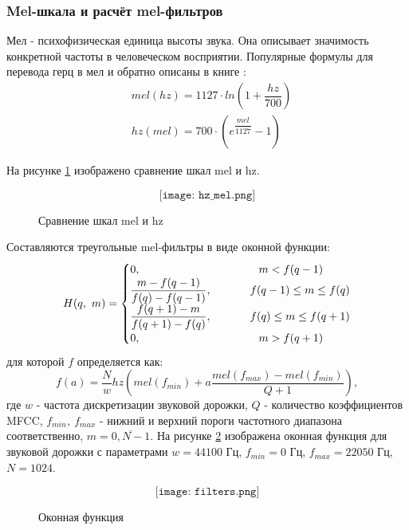 \subsubsection{Mel-шкала и расчёт mel-фильтров}
Мел - психофизическая единица высоты звука. Она описывает значимость конкретной частоты в человеческом восприятии. 
Популярные формулы для перевода герц в мел и обратно описаны в книге \cite{Mel}:
\begin{align}
	&mel(hz) = 1127 \cdot ln(1 + \dfrac{hz}{700})\\
	&hz(mel) = 700 \cdot (e^{\dfrac{mel}{1127}}-1)
\end{align}

На рисунке \ref{fig:hz_mel} изображено сравнение шкал mel и hz.

\begin{figure}[H]
	\[\texttt{[image: hz\_mel.png]}\]
	\caption{Сравнение шкал mel и hz}
	\label{fig:hz_mel}
\end{figure}


Составляются треугольные mel-фильтры в виде оконной функции:
\begin{equation}
	H(q,~m)=
	\begin{cases}
		0, 										     & \Phantom \phantom{-}    m < f(q-1)\\
		\dfrac{m-f(q-1)}{f(q)-f(q-1)},   & \Phantom f(q-1) \leq m \leq f(q)\\
		\dfrac{f(q+1)-m}{f(q+1)-f(q)}, & \Phantom f(q) \leq m \leq f(q+1)\\
		0,                                           & \Phantom \phantom{-}   m > f(q+1)\\
	\end{cases}
\end{equation}
для которой $f$ определяется как:
\begin{equation}
	f(a)=\dfrac{N}{w} hz(mel(f_{min})+a \dfrac{mel(f_{max})-mel(f_{min})}{Q+1}),
\end{equation}
где $w$ - частота дискретизации звуковой дорожки, $Q$ - количество коэффициентов MFCC, $f_{min},~f_{max}$ - нижний и верхний пороги частотного диапазона соответственно, $m=\overline{0,N-1}$. На рисунке \ref{fig:filters} изображена оконная функция для звуковой дорожки с параметрами $w=44100$ Гц, $f_{min}=0$ Гц, $f_{max}=22050$ Гц, $N=1024$.

\begin{figure}[H]
	\[\texttt{[image: filters.png]}\]
	\caption{Оконная функция}
	\label{fig:filters}
\end{figure}



